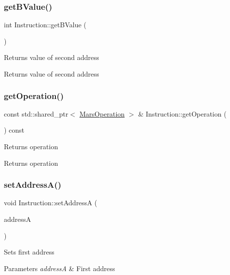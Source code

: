 \subsubsection{\texorpdfstring{get\+B\+Value()}{getBValue()}}
{\footnotesize\ttfamily int Instruction\+::get\+B\+Value (\begin{DoxyParamCaption}{ }\end{DoxyParamCaption})}

Returns value of second address \begin{DoxyReturn}{Returns}
value of second address 
\end{DoxyReturn}
\mbox{\label{classInstruction_a2cff68de6bb0e59aa8d32adb7c5a956a}} 
\subsubsection{\texorpdfstring{get\+Operation()}{getOperation()}}
{\footnotesize\ttfamily const std\+::shared\+\_\+ptr$<$ \hyperlink{classMarsOperation}{Mars\+Operation} $>$ \& Instruction\+::get\+Operation (\begin{DoxyParamCaption}{ }\end{DoxyParamCaption}) const}

Returns operation \begin{DoxyReturn}{Returns}
operation 
\end{DoxyReturn}
\mbox{\label{classInstruction_a3d0eeea6b5824a82518383e282550a39}} 
\subsubsection{\texorpdfstring{set\+Address\+A()}{setAddressA()}}
{\footnotesize\ttfamily void Instruction\+::set\+AddressA (\begin{DoxyParamCaption}\item[{const std\+::shared\+\_\+ptr$<$ \hyperlink{classInstructionModifier}{Instruction\+Modifier} $>$ \&}]{addressA }\end{DoxyParamCaption})}

Sets first address 
\begin{DoxyParams}{Parameters}
{\em addressA} & First address \\
\hline
\end{DoxyParams}
\mbox{\label{classInstruction_a8537c5d0dd3696b5f48ae297f4e89dbf}} 
